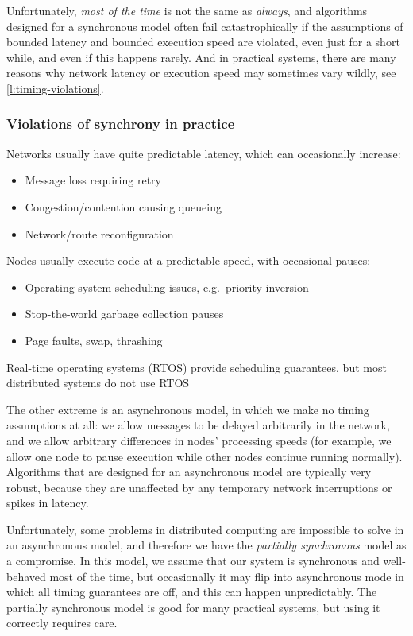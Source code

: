 Unfortunately, \emph{most of the time} is not the same as \emph{always}, and algorithms designed for a synchronous model often fail catastrophically if the assumptions of bounded latency and bounded execution speed are violated, even just for a short while, and even if this happens rarely.
And in practical systems, there are many reasons why network latency or execution speed may sometimes vary wildly, see \autoref{l:timing-violations}.

\begin{frame}
    \label{s:timing-violations}
    \frametitle{Violations of synchrony in practice}
    Networks usually have quite predictable latency, which can occasionally increase:
    \begin{itemize}
        \item Message loss requiring retry
        \item Congestion/contention causing queueing
        \item Network/route reconfiguration\\[1em]
    \end{itemize}\pause
    Nodes usually execute code at a predictable speed, with occasional pauses:
    \begin{itemize}
        \item Operating system scheduling issues, e.g.\ priority inversion
        \item Stop-the-world garbage collection pauses
        \item Page faults, swap, thrashing
    \end{itemize}
    Real-time operating systems (RTOS) provide scheduling guarantees, but most distributed systems do not use RTOS
\end{frame}
\label{l:timing-violations}

The other extreme is an asynchronous model, in which we make no timing assumptions at all: we allow messages to be delayed arbitrarily in the network, and we allow arbitrary differences in nodes' processing speeds (for example, we allow one node to pause execution while other nodes continue running normally).
Algorithms that are designed for an asynchronous model are typically very robust, because they are unaffected by any temporary network interruptions or spikes in latency.

Unfortunately, some problems in distributed computing are impossible to solve in an asynchronous model, and therefore we have the \emph{partially synchronous} model as a compromise.
In this model, we assume that our system is synchronous and well-behaved most of the time, but occasionally it may flip into asynchronous mode in which all timing guarantees are off, and this can happen unpredictably.
The partially synchronous model is good for many practical systems, but using it correctly requires care.

